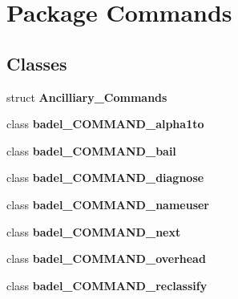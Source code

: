 \hypertarget{namespace_commands}{\section{Package Commands}
\label{namespace_commands}
}
\subsection*{Classes}
\begin{DoxyCompactItemize}
\item 
struct {\bfseries Ancilliary\+\_\+\+Commands}
\item 
class {\bfseries badel\+\_\+\+C\+O\+M\+M\+A\+N\+D\+\_\+alpha1to}
\item 
class {\bfseries badel\+\_\+\+C\+O\+M\+M\+A\+N\+D\+\_\+bail}
\item 
class {\bfseries badel\+\_\+\+C\+O\+M\+M\+A\+N\+D\+\_\+diagnose}
\item 
class {\bfseries badel\+\_\+\+C\+O\+M\+M\+A\+N\+D\+\_\+nameuser}
\item 
class {\bfseries badel\+\_\+\+C\+O\+M\+M\+A\+N\+D\+\_\+next}
\item 
class {\bfseries badel\+\_\+\+C\+O\+M\+M\+A\+N\+D\+\_\+overhead}
\item 
class {\bfseries badel\+\_\+\+C\+O\+M\+M\+A\+N\+D\+\_\+reclassify}
\end{DoxyCompactItemize}
